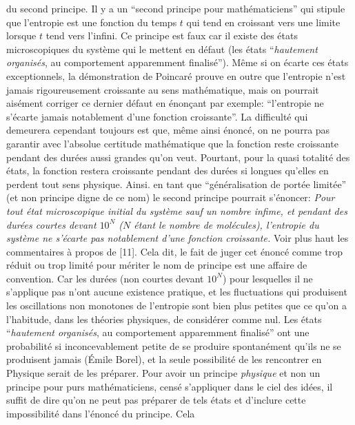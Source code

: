 du second principe. Il y a un ``second principe pour math\'ematiciens'' qui 
stipule que l'entropie est une fonction du temps $t$ qui tend en croissant 
vers une limite lorsque $t$ tend vers l'infini. Ce principe est faux car 
il existe des \'etats microscopiques du syst\`eme qui le mettent en d\'efaut 
(les \'etats ``{\it hautement organis\'es}, au comportement apparemment 
finalis\'e''). M\^eme si on \'ecarte ces \'etats exceptionnels, la 
d\'emonstration de Poincar\'e prouve en outre que l'entropie n'est 
jamais rigoureusement croissante au sens math\'ematique, mais on pourrait 
ais\'ement corriger ce dernier d\'efaut en \'enon\c{c}ant par exemple: 
``l'entropie ne s'\'ecarte jamais notablement d'une fonction croissante''. 
La difficult\'e qui demeurera cependant toujours est que, m\^eme 
ainsi \'enonc\'e, on ne pourra pas garantir avec l'absolue certitude 
math\'ematique que la fonction reste croissante pendant des dur\'ees 
aussi grandes qu'on veut. Pourtant, pour la quasi totalit\'e des \'etats, 
la fonction restera croissante pendant des dur\'ees si longues qu'elles 
en perdent tout sens physique. Ainsi. en tant que ``g\'en\'eralisation de 
port\'ee limit\'ee'' (et non principe digne de ce nom) le second principe 
pourrait s'\'enoncer: 
\medskip
{\sl Pour tout \'etat microscopique initial du syst\`eme sauf un nombre infime,
et pendant des dur\'ees courtes devant $10^N$ ($N$ \'etant le nombre de 
mol\'ecules), l'entropie du syst\`eme ne s'\'ecarte pas notablement d'une 
fonction croissante. }
\medskip
Voir plus haut les commentaires \`a propos de [11]. 
\medskip
Cela dit, le fait de juger cet \'enonc\'e comme trop r\'eduit ou trop 
limit\'e pour m\'eriter le nom de principe est une affaire de convention. 
Car les dur\'ees (non courtes devant $10^N$) pour lesquelles il ne 
s'applique pas n'ont aucune existence pratique, et les fluctuations 
qui produisent les oscillations non monotones de l'entropie sont bien plus 
petites que ce qu'on a l'habitude, dans les th\'eories physiques, de 
consid\'erer comme nul. 
\medskip
Les \'etats ``{\it hautement organis\'es}, au comportement apparemment 
finalis\'e'' ont une probabilit\'e si inconcevablement petite de se produire 
spontan\'ement qu'ils ne se produisent jamais (\'Emile Borel), et la seule 
possibilit\'e de les rencontrer en Physique serait de les pr\'eparer. Pour 
avoir un principe {\it physique} et non un principe pour purs 
math\'ematiciens, cens\'e s'appliquer dans le ciel des 
id\'ees, il suffit de dire qu'on ne peut pas pr\'eparer de tels \'etats 
et d'inclure cette impossibilit\'e dans l'\'enonc\'e du principe. Cela 
